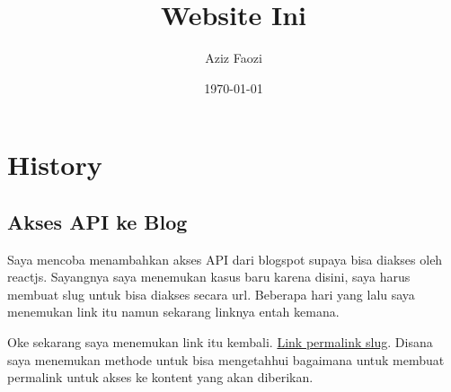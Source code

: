 \documentclass[11pt]{article}
\author{Aziz Faozi}
\date{\today}
\title{Website Ini}
\begin{document}
\maketitle
\tableofcontents


\section{History}
\label{sec:org6ee2524}
\subsection{Akses API ke Blog}
\label{sec:org81cc873}
Saya mencoba menambahkan akses API dari blogspot supaya bisa diakses oleh
reactjs. Sayangnya saya menemukan kasus baru karena disini, saya harus membuat
slug untuk bisa diakses secara url. Beberapa hari yang lalu saya menemukan link
itu namun sekarang linknya entah kemana. 

Oke sekarang saya menemukan link itu kembali. \href{file:///usr/bin/java -jar /home/ubuntu/gfw-demo/target/gfw-demo-0.0.1-SNAPSHOT.jar}{Link permalink slug}. Disana saya 
menemukan methode untuk bisa mengetahhui bagaimana untuk membuat permalink
untuk akses ke kontent yang akan diberikan.
\end{document}
